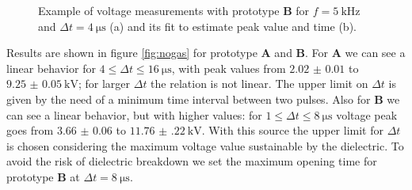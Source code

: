 \begin{figure}
 \centering
 \hfill
 \caption{Example of voltage measurements with prototype \textbf{B} for $f = \SI{5}{\kilo\hertz}$ and $\Delta t = \SI{4}{\micro\second}$ (a) and its fit to estimate peak value and time (b).}
 \label{fig:tensionpeak}
\end{figure}

Results are shown in figure \ref{fig:nogas} for prototype \textbf{A} and \textbf{B}.
For \textbf{A} we can see a linear behavior for $4 \le \Delta t \le \SI{16}{\micro\second}$, with peak values from $\num{2.02(1)}$ to $\SI{9.25(5)}{\kilo\volt}$; for larger $\Delta t$ the relation is not linear. The upper limit on $\Delta t$ is given by the need of a minimum time interval between two pulses.
Also for \textbf{B} we can see a linear behavior, but with higher values: for $1 \le \Delta t \le \SI{8}{\micro\second}$ voltage peak goes from $\num{3.66(6)}$ to $\SI{11.76(22)}{\kilo\volt}$. With this source the upper limit for $\Delta t$ is chosen considering the maximum voltage value sustainable by the dielectric. To avoid the risk of dielectric breakdown we set the maximum opening time for prototype \textbf{B} at $\Delta t = \SI{8}{\micro\second}$.

